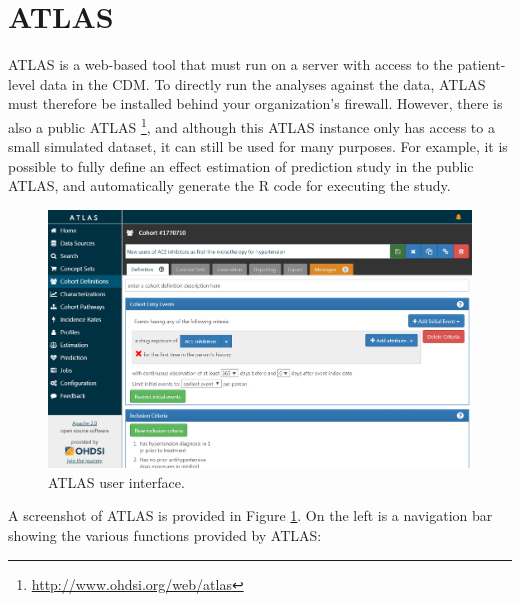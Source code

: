 \documentclass[11pt]{book}
\let\rmarkdownfootnote\footnote%
\def\footnote{\protect\rmarkdownfootnote}
\begin{document}
\section{ATLAS}\label{atlas}

ATLAS is a web-based tool that must run on a server with access to the
patient-level data in the CDM. To directly run the analyses against the
data, ATLAS must therefore be installed behind your organization's
firewall. However, there is also a public ATLAS \footnote{\url{http://www.ohdsi.org/web/atlas}},
and although this ATLAS instance only has access to a small simulated
dataset, it can still be used for many purposes. For example, it is
possible to fully define an effect estimation of prediction study in the
public ATLAS, and automatically generate the R code for executing the
study.

\begin{figure}

{\centering \includegraphics[width=1\linewidth]{images/OhdsiAnalyticsTools/atlas} 

}

\caption{ATLAS user interface.}\label{fig:atlas}
\end{figure}

A screenshot of ATLAS is provided in Figure \ref{fig:atlas}. On the left
is a navigation bar showing the various functions provided by ATLAS:
\end{document}
